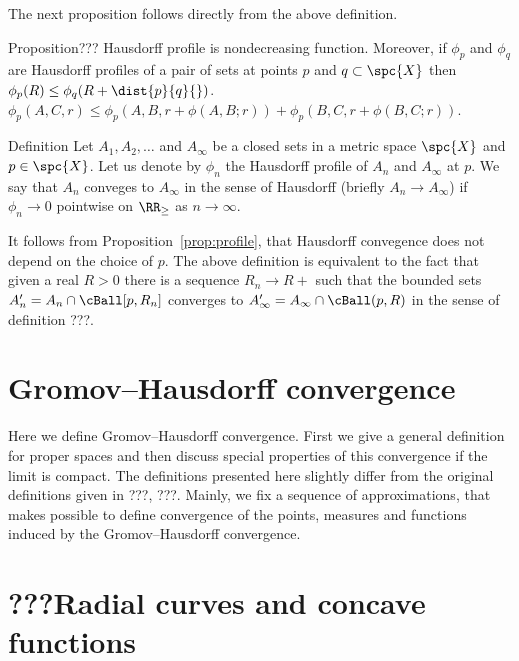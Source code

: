 The next proposition follows directly from the above definition.

\begin{thm}{Proposition}\label{prop:profile}???
Hausdorff profile is nondecreasing function. 
Moreover, if $\phi_p$ and $\phi_q$ are Hausdorff profiles of a pair of sets at points $p$ and $q\subset\spc{X}$
then $\phi_p(R)\le \phi_q(R+\dist{p}{q}{})$.
$\phi_p(A,C,r)\le \phi_p(A,B,r+\phi(A,B;r))+\phi_p(B,C,r+\phi(B,C;r))$.
\end{thm}

\begin{thm}{Definition} 
Let $A_1, A_2,\dots$ and $A_\infty$ be a closed sets in a metric space $\spc{X}$
and $p\in\spc{X}$.
Let us denote by $\phi_n$ the Hausdorff profile of $A_n$ and $A_\infty$ at $p$.
We say that $A_n$ conveges to $A_\infty$ in the sense of Hausdorff (briefly $A_n\to A_\infty$)
if  $\phi_n\to 0$ pointwise on $\RR_\ge$ as $n\to\infty$.
\end{thm}

It follows from Proposition~\ref{prop:profile}, 
that Hausdorff convegence does not depend on the choice of $p$.
The above definition is equivalent to the fact that given a real $R>0$ there is a sequence $R_n\to R+$ such that the bounded sets $A_n'= A_n\cap\cBall[p,R_n]$ converges to $A_\infty'=A_\infty\cap\cBall(p,R)$ in the sense of definition ???.

\section{Gromov--Hausdorff convergence}
\label{sec:GH}

Here we define Gromov--Hausdorff convergence.
First we give a general definition for proper spaces 
and then discuss special properties of this convergence if the limit is compact.
The definitions presented here slightly differ from the original definitions given in ???, ???.
Mainly, we fix a sequence of approximations,
that makes possible to define convergence of the points, measures and functions induced by the Gromov--Hausdorff convergence.
















\section{???Radial curves and concave functions}

